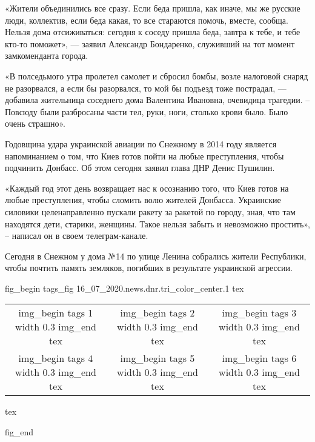 «Жители объединились все сразу. Если беда пришла, как иначе, мы же русские
люди, коллектив, если беда какая, то все стараются помочь, вместе, сообща.
Нельзя дома отсиживаться: сегодня к соседу пришла беда, завтра к тебе, и тебе
кто-то поможет», — заявил Александр Бондаренко, служивший на тот момент
замкоменданта города.

«В полседьмого утра пролетел самолет и сбросил бомбы, возле налоговой снаряд не
разорвался, а если бы разорвался, то мой бы подъезд тоже пострадал, — добавила
жительница соседнего дома Валентина Ивановна, очевидица трагедии. – Повсюду
были разбросаны части тел, руки, ноги, столько крови было. Было очень страшно».

Годовщина удара украинской авиации по Снежному в 2014 году является
напоминанием о том, что Киев готов пойти на любые преступления, чтобы подчинить
Донбасс. Об этом сегодня заявил глава ДНР Денис Пушилин.

«Каждый год этот день возвращает нас к осознанию того, что Киев готов на любые
преступления, чтобы сломить волю жителей Донбасса. Украинские силовики
целенаправленно пускали ракету за ракетой по городу, зная, что там находятся
дети, старики, женщины. Такое нельзя забыть и невозможно простить», – написал
он в своем телеграм-канале.

Сегодня в Снежном у дома №14 по улице Ленина собрались жители Республики, чтобы
почтить память земляков, погибших в результате украинской агрессии.

\ifcmt
fig_begin
	tags_fig 16_07_2020.news.dnr.tri_color_center.1
	tex \begin{tabular}{ccc}
	img_begin 
		tags 1
		width 0.3
	img_end
	tex &
	img_begin 
		tags 2
		width 0.3
	img_end
	tex &
	img_begin 
		tags 3
		width 0.3
	img_end
	tex \\
	img_begin 
		tags 4
		width 0.3
	img_end
	tex &
	img_begin 
		tags 5
		width 0.3
	img_end
	tex &
	img_begin 
		tags 6
		width 0.3
	img_end
	tex \end{tabular}
	tex \caption{\sectitle}
fig_end
\fi

  

